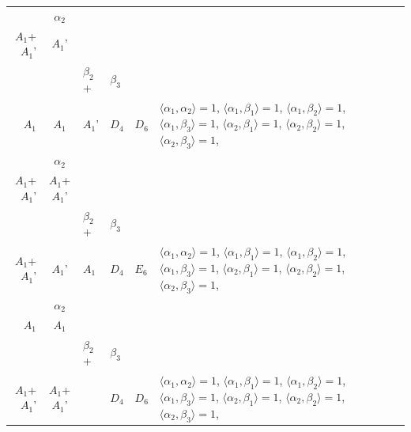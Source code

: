 \documentclass[12pt]{report}
\begin{document}
\begin{appendix}
{\begin{longtable}{rcl p{1cm}p{1cm}p{3cm} }
\begin{tabular}{cc}$\alpha_1$+ & $\alpha_2$\\\tiny{ $A_1$+$A_1$' } & \tiny{ $A_1$' }\end{tabular} &\begin{tabular}{c} = \\~ \end{tabular} & \begin{tabular}{ccc}$\beta_1$+ & $\beta_2$+ & $\beta_3$\\\tiny{ $A_1$ } & \tiny{ $A_1$ } & \tiny{ $A_1$' }\end{tabular} & $D_4$ & $D_6$ & $\langle\alpha_1, \alpha_2\rangle=1$,  $\langle\alpha_1, \beta_1\rangle=1$, $\langle\alpha_1, \beta_2\rangle=1$, $\langle\alpha_1, \beta_3\rangle=1$, $\langle\alpha_2, \beta_1\rangle=1$, $\langle\alpha_2, \beta_2\rangle=1$, $\langle\alpha_2, \beta_3\rangle=1$, 
\\
\begin{tabular}{cc}$\alpha_1$+ & $\alpha_2$\\\tiny{ $A_1$+$A_1$' } & \tiny{ $A_1$+$A_1$' }\end{tabular} &\begin{tabular}{c} = \\~ \end{tabular} & \begin{tabular}{ccc}$\beta_1$+ & $\beta_2$+ & $\beta_3$\\\tiny{ $A_1$+$A_1$' } & \tiny{ $A_1$' } & \tiny{ $A_1$ }\end{tabular} & $D_4$ & $E_6$ & $\langle\alpha_1, \alpha_2\rangle=1$,  $\langle\alpha_1, \beta_1\rangle=1$, $\langle\alpha_1, \beta_2\rangle=1$, $\langle\alpha_1, \beta_3\rangle=1$, $\langle\alpha_2, \beta_1\rangle=1$, $\langle\alpha_2, \beta_2\rangle=1$, $\langle\alpha_2, \beta_3\rangle=1$, 
\\
\begin{tabular}{cc}$\alpha_1$+ & $\alpha_2$\\\tiny{ $A_1$ } & \tiny{ $A_1$ }\end{tabular} &\begin{tabular}{c} = \\~ \end{tabular} & \begin{tabular}{ccc}$\beta_1$+ & $\beta_2$+ & $\beta_3$\\\tiny{ $A_1$+$A_1$' } & \tiny{ $A_1$+$A_1$' } & \tiny{  }\end{tabular} & $D_4$ & $D_6$ & $\langle\alpha_1, \alpha_2\rangle=1$,  $\langle\alpha_1, \beta_1\rangle=1$, $\langle\alpha_1, \beta_2\rangle=1$, $\langle\alpha_1, \beta_3\rangle=1$, $\langle\alpha_2, \beta_1\rangle=1$, $\langle\alpha_2, \beta_2\rangle=1$, $\langle\alpha_2, \beta_3\rangle=1$, 

\end{longtable}}
\end{appendix}
\end{document}
